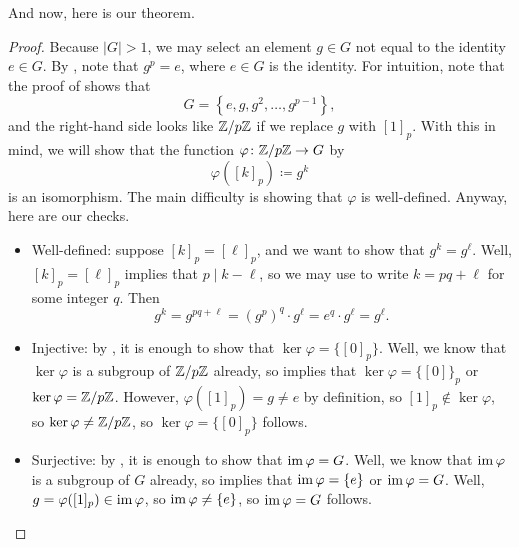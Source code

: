 \documentclass[../notes.tex]{subfiles}
\begin{document}
And now, here is our theorem.
\groupsofordp*
\begin{proof}
    Because $\left|G\right|>1$, we may select an element $g\in G$ not equal to the identity $e\in G$. By , note that $g^p=e$, where $e\in G$ is the identity. For intuition, note that the proof of  shows that
    \[G=\left\{e,g,g^2,\ldots,g^{p-1}\right\},\]
    and the right-hand side looks like $\mathbb Z/p\mathbb Z$ if we replace $g$ with $[1]_p$. With this in mind, we will show that the function $\varphi\colon\mathbb Z/p\mathbb Z\to G$ by
    \[\varphi([k]_p)\coloneqq g^k\]
    is an isomorphism. The main difficulty is showing that $\varphi$ is well-defined. Anyway, here are our checks.
    \begin{itemize}
        \item Well-defined: suppose $[k]_p=[\ell]_p$, and we want to show that $g^k=g^\ell$. Well, $[k]_p=[\ell]_p$ implies that $p\mid k-\ell$, so we may use  to write $k=pq+\ell$ for some integer $q$. Then
        \[g^k=g^{pq+\ell}=\left(g^p\right)^q\cdot g^\ell=e^q\cdot g^\ell=g^\ell.\]
        \item Injective: by , it is enough to show that $\ker\varphi=\{[0]_p\}$. Well, we know that $\ker\varphi$ is a subgroup of $\mathbb Z/p\mathbb Z$ already, so  implies that $\ker\varphi=\{[0]\}_p$ or $\ker\varphi=\mathbb Z/p\mathbb Z$. However, $\varphi([1]_p)=g\ne e$ by definition, so $[1]_p\notin\ker\varphi$, so $\ker\varphi\ne\mathbb Z/p\mathbb Z$, so $\ker\varphi=\{[0]_p\}$ follows.
        \item Surjective: by , it is enough to show that $\operatorname{im}\varphi=G$. Well, we know that $\operatorname{im}\varphi$ is a subgroup of $G$ already, so  implies that $\operatorname{im}\varphi=\{e\}$ or $\operatorname{im}\varphi=G$. Well, $g=\varphi([1]_p)\in\operatorname{im}\varphi$, so $\operatorname{im}\varphi\ne\{e\}$, so $\operatorname{im}\varphi=G$ follows.
        \qedhere
    \end{itemize}
\end{proof}

\end{document}
